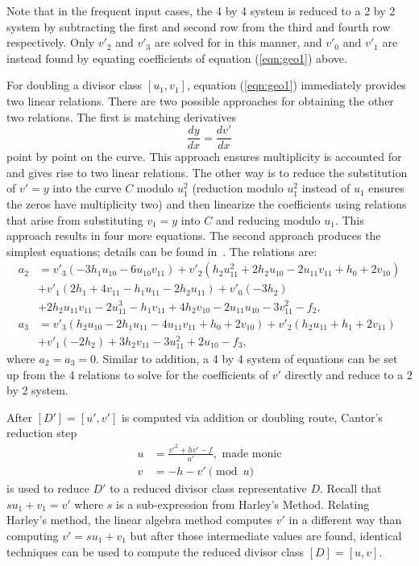 Note that in the frequent input cases, the 4 by 4 system is reduced to a 2 by 2
system by subtracting the first and second row from the third and fourth row
respectively. Only $v'_2$ and $v'_3$ are solved for in this manner, and $v'_0$
and $v'_1$ are instead found by equating coefficients of equation
(\ref{eqn:geo1}) above.

For doubling a divisor class $[u_1,v_1]$, equation (\ref{eqn:geo1}) immediately
provides two linear relations. There are two possible approaches for obtaining
the other two relations. The first is matching derivatives $$\frac{dy}{dx} =
\frac{dv'}{dx}$$ point by point on the curve. This approach ensures multiplicity
is accounted for and gives rise to two linear relations. The other way is to
reduce the substitution of $v' = y$ into the curve $C$ modulo $u_1^2$ (reduction
modulo  $u_1^2$ instead of $u_1$ ensures the zeros have multiplicity two) and
then linearize the coefficients using relations that arise from substituting
$v_1 = y$ into $C$ and reducing  modulo $u_1$. This approach results in four
more equations. The second approach produces the simplest equations; details can
be found in~\cite{CostelloLauter_geo_2011}. The relations are: 
\begin{align} a_2
&= v'_3(-3h_1u_{10} - 6u_{10}v_{11}) + v'_2(h_2u_{11}^2 + 2h_2u_{10} -
2u_{11}v_{11} + h_0 +2v_{10}) \nonumber  \\ 
&+ v'_1(2h_1 + 4v_{11} -h_1u_{11} - 2h_2u_{11})+ v'_0(-3h_2) \nonumber \\
&+ 2h_2u_{11}v_{11} - 2u_{11}^3 - h_1v_{11} + 4h_2v_{10} -2u_{11}u_{10} - 3v_{11}^2 - f_2,  \nonumber \\ 
a_3 &= v'_3(h_2u_{10} - 2h_1u_{11} - 4u_{11}v_{11} + h_0 + 2v_{10}) + v'_2(h_2u_{11} + h_1 + 2v_{11}) \nonumber \\  
&+ v'_1(-2h_2) + 3h_2v_{11} - 3u_{11}^2 + 2u_{10} - f_3, \nonumber
\end{align} 
where $a_2 = a_3 = 0$. Similar to addition, a 4 by 4 system of equations can be
set up from the 4 relations to solve for the coefficients of $v'$ directly and
reduce to a 2 by 2 system.

After $[D'] = [u',v']$ is computed via addition or doubling route, Cantor's
reduction step 
\begin{align*} u &= \frac{v'^2 + hv' - f}{u'}, \mbox{ made monic}\\
v &= -h - v' \pmod{u}
\end{align*} 
is used to reduce $D'$ to a reduced divisor class representative $D$.
Recall that $su_1 + v_1 = v' $ where $s$ is a sub-expression from Harley's
Method. Relating Harley's method, the linear algebra method computes $v'$
in a different way than computing $v' = su_1 + v_1$ but after those intermediate
values are found, identical techniques can be used to compute the reduced
divisor class $[D] = [u,v]$.



